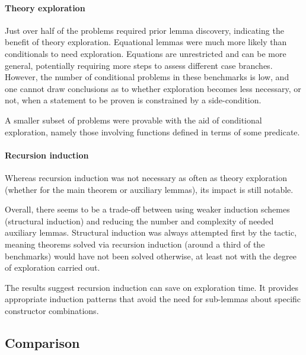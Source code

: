 

\paragraph{Theory exploration}

Just over half of the problems required prior lemma discovery, indicating the benefit of theory exploration.
%
Equational lemmas were much more likely than conditionals to need exploration.
%
Equations are unrestricted and can be more general, potentially requiring more steps to assess different case branches.
%
However, the number of conditional problems in these benchmarks is low, and one cannot draw conclusions as to whether exploration becomes less necessary, or not, when a statement to be proven is constrained by a side-condition.%

A smaller subset of problems were provable with the aid of conditional exploration, namely those involving functions defined in terms of some predicate.

\paragraph{Recursion induction}

Whereas recursion induction was not necessary as often as theory exploration (whether for the main theorem or auxiliary lemmas), its impact is still notable.

Overall, there seems to be a trade-off between using weaker induction schemes (structural induction) and reducing the number and complexity of needed auxiliary lemmas.
%
Structural induction was always attempted first by the tactic, meaning theorems solved via recursion induction (around a third of the benchmarks) would have not been solved otherwise, at least not with the degree of exploration carried out.
 
The results suggest recursion induction can save on exploration time.
%
It provides appropriate induction patterns that avoid the need for sub-lemmas about specific constructor combinations.


\subsection{Comparison}


